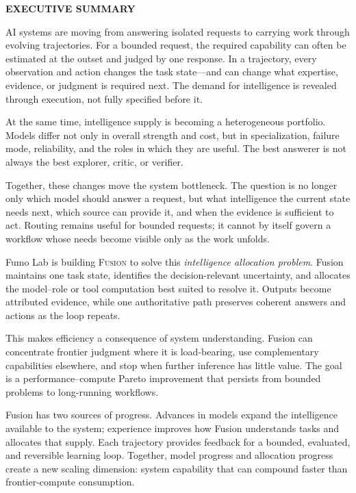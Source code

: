 \documentclass[11pt,a4paper,parskip=half,headings=normal]{scrartcl}
\newcommand{\systemname}{\textsc{Fusion}\xspace}
\begin{document}
\vspace{0.55cm}
\begin{tcolorbox}[
  enhanced,
  breakable,
  colback=fusionpaper,
  colframe=fusionpaper,
  boxrule=0pt,
  arc=2pt,
  left=14pt,right=14pt,top=12pt,bottom=12pt
]
{\sffamily\bfseries\color{fusionink}EXECUTIVE SUMMARY}\par\smallskip
AI systems are moving from answering isolated requests to carrying work through
evolving trajectories. For a bounded request, the required capability can often
be estimated at the outset and judged by one response. In a trajectory, every
observation and action changes the task state---and can change what expertise,
evidence, or judgment is required next. The demand for intelligence is revealed
through execution, not fully specified before it.

At the same time, intelligence supply is becoming a heterogeneous portfolio.
Models differ not only in overall strength and cost, but in specialization,
failure mode, reliability, and the roles in which they are useful. The best
answerer is not always the best explorer, critic, or verifier.

Together, these changes move the system bottleneck. The question is no longer
only which model should answer a request, but what intelligence the current
state needs next, which source can provide it, and when the evidence is
sufficient to act. Routing remains useful for bounded requests; it cannot by
itself govern a workflow whose needs become visible only as the work unfolds.

Fumo Lab is building \systemname to solve this \emph{intelligence allocation
problem}. Fusion maintains one task state, identifies the decision-relevant
uncertainty, and allocates the model--role or tool computation best suited to
resolve it. Outputs become attributed evidence, while one authoritative path
preserves coherent answers and actions as the loop repeats.

This makes efficiency a consequence of system understanding. Fusion can
concentrate frontier judgment where it is load-bearing, use complementary
capabilities elsewhere, and stop when further inference has little value. The
goal is a performance--compute Pareto improvement that persists from bounded
problems to long-running workflows.

Fusion has two sources of progress. Advances in models expand the intelligence
available to the system; experience improves how Fusion understands tasks and
allocates that supply. Each trajectory provides feedback for a bounded,
evaluated, and reversible learning loop. Together, model progress and allocation
progress create a new scaling dimension: system capability that can compound
faster than frontier-compute consumption.
\end{tcolorbox}

\clearpage
{}













\end{document}
